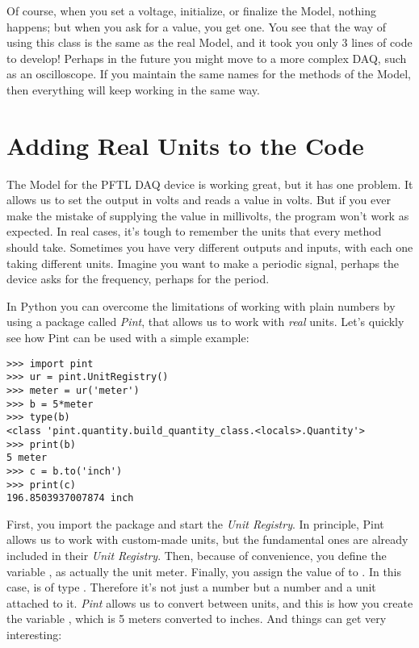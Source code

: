 Of course, when you set a voltage, initialize, or finalize the Model, nothing happens; but when you ask for a value, you get one. You see that the way of using this class is the same as the real Model, and it took you only 3 lines of code to develop! Perhaps in the future you might move to a more complex DAQ, such as an oscilloscope. If you maintain the same names for the methods of the Model, then everything will keep working in the same way.


\section{Adding Real Units to the Code}\label{sec:pint}
The Model for the {PFTL DAQ} device is working great, but it has one problem. It allows us to set the output in volts and reads a value in volts. But if you ever make the mistake of supplying the value in millivolts, the program won't work as expected. In real cases, it's tough to remember the units that every method should take. Sometimes you have very different outputs and inputs, with each one taking different units. Imagine you want to make a periodic signal, perhaps the device asks for the frequency, perhaps for the period.

In Python you can overcome the limitations of working with plain numbers by using a package called \emph{Pint}, that allows us to work with \emph{real} units. Let's quickly see how Pint can be used with a simple example:

\begin{verbatim}
>>> import pint
>>> ur = pint.UnitRegistry()
>>> meter = ur('meter')
>>> b = 5*meter
>>> type(b)
<class 'pint.quantity.build_quantity_class.<locals>.Quantity'>
>>> print(b)
5 meter
>>> c = b.to('inch')
>>> print(c)
196.8503937007874 inch
\end{verbatim}

First, you import the package and start the \emph{Unit Registry}. In principle, Pint allows us to work with custom-made units, but the fundamental ones are already included in their \emph{Unit Registry}. Then, because of convenience, you define the variable , as actually the unit meter. Finally, you assign the value of  to . In this case,  is of type . Therefore it's not just a number but a number and a unit attached to it. \emph{Pint} allows us to convert between units, and this is how you create the variable , which is 5 meters converted to inches. And things can get very interesting:

